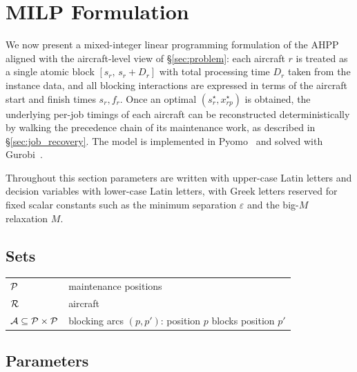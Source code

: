 \section{MILP Formulation}
\label{sec:milp}

We now present a mixed-integer linear programming formulation of the AHPP
aligned with the aircraft-level view of \S\ref{sec:problem}: each aircraft
$r$ is treated as a single atomic block $[s_r,\, s_r + D_r]$ with total
processing time $D_r$ taken from the instance data, and all blocking
interactions are expressed in terms of the aircraft start and finish
times $s_r, f_r$.  Once an optimal $(s_r^\star, x_{rp}^\star)$ is
obtained, the underlying per-job timings of each aircraft can be
reconstructed deterministically by walking the precedence chain of its
maintenance work, as described in \S\ref{sec:job_recovery}.  The model is
implemented in Pyomo~\citep{Bynum2021} and solved with
Gurobi~\citep{Gurobi2023}.

Throughout this section parameters are written with upper-case Latin
letters and decision variables with lower-case Latin letters, with Greek
letters reserved for fixed scalar constants such as the minimum
separation $\varepsilon$ and the big-$M$ relaxation $M$.

\subsection*{Sets}

\begin{tabular}{@{}l@{\quad}p{}@{}}
  $\mathcal{P}$
    & maintenance positions \\
  $\mathcal{R}$
    & aircraft \\
  $\mathcal{A} \subseteq \mathcal{P} \times \mathcal{P}$
    & blocking arcs $(p, p')$: position $p$ blocks position $p'$ \\
\end{tabular}

\subsection*{Parameters}

